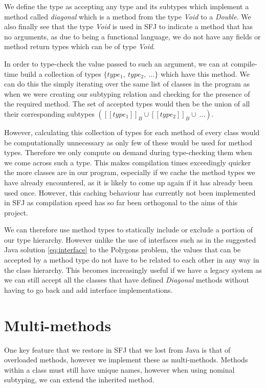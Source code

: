 \documentclass{l4proj}
\begin{document}
We define the type as accepting any type and its subtypes which implement a method called \emph{diagonal} which is a method from the type \emph{Void} to a \emph{Double}.
We also finally see that the type \emph{Void} is used in SFJ to indicate a method that has no arguments, as due to being a functional language, we do not have any fields or method return types which can be of type \emph{Void}.

In order to type-check the value passed to such an argument, we can at compile-time build a collection of types $\{type_{1},\ type_{2},\ \ldots\}$ which have this method.
We can do this the simply iterating over the same list of classes in the program as when we were creating our subtyping relation and checking for the presence of the required method.
The set of accepted types would then be the union of all their corresponding subtypes $([\![type_{1}]\!]_{B} \cup [\![type_{2}]\!]_{B} \cup\ \ldots)$.

However, calculating this collection of types for each method of every class would be computationally unnecessary as only few of these would be used for method types.
Therefore we only compute on demand during type-checking them when we come across such a type.
This makes compilation times exceedingly quicker the more classes are in our program, especially if we cache the method types we have already encountered, as it is likely to come up again if it has already been used once.
However, this caching behaviour has currently not been implemented in SFJ as compilation speed has so far been orthogonal to the aims of this project.

We can therefore use method types to statically include or exclude a portion of our type hierarchy.
However unlike the use of interfaces such as in the suggested Java solution \ref{eq:interface} to the Polygons problem, the values that can be accepted by a method type do not have to be related to each other in any way in the class hierarchy.
This becomes increasingly useful if we have a legacy system as we can still accept all the classes that have defined \emph{Diagonal} methods without having to go back and add interface implementations.

\section{Multi-methods}

One key feature that we restore in SFJ that we lost from Java is that of overloaded methods, however we implement these as multi-methods.
Methods within a class must still have unique names, however when using nominal subtyping, we can extend the inherited method.
\end{document}
